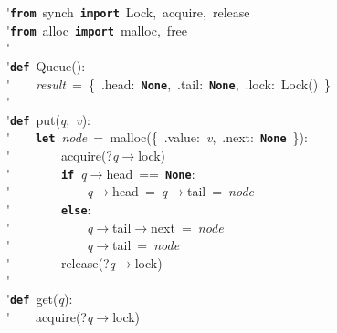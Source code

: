 \'\>\texttt{\textbf{from}}~synch~\texttt{\textbf{import}}~Lock,~acquire,~release\\

\'\>\texttt{\textbf{from}}~alloc~\texttt{\textbf{import}}~malloc,~free\\

\'\>\\

\'\>\texttt{\textbf{def}}~Queue():\\

\'\>~~~~\textit{result}~=~\{~.head:~\texttt{\textbf{None}},~.tail:~\texttt{\textbf{None}},~.lock:~Lock()~\}\\

\'\>\\

\'\>\texttt{\textbf{def}}~put(\textit{q},~\textit{v}):\\

\'\>~~~~\texttt{\textbf{let}}~\textit{node}~=~malloc(\{~.value:~\textit{v},~.next:~\texttt{\textbf{None}}~\}):\\

\'\>~~~~~~~~acquire(?\textit{q}$\rightarrow$lock)\\

\'\>~~~~~~~~\texttt{\textbf{if}}~\textit{q}$\rightarrow$head~==~\texttt{\textbf{None}}:\\

\'\>~~~~~~~~~~~~\textit{q}$\rightarrow$head~=~\textit{q}$\rightarrow$tail~=~\textit{node}\\

\'\>~~~~~~~~\texttt{\textbf{else}}:\\

\'\>~~~~~~~~~~~~\textit{q}$\rightarrow$tail$\rightarrow$next~=~\textit{node}\\

\'\>~~~~~~~~~~~~\textit{q}$\rightarrow$tail~=~\textit{node}\\

\'\>~~~~~~~~release(?\textit{q}$\rightarrow$lock)\\

\'\>~~~~\\

\'\>\texttt{\textbf{def}}~get(\textit{q}):\\

\'\>~~~~acquire(?\textit{q}$\rightarrow$lock)\\

